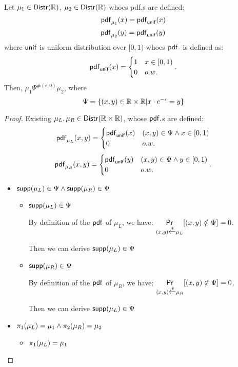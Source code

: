 \documentclass{article}
\begin{document}
\begin{thm}
Let $\mu_1 \in \mathsf{Distr}(\mathbb{R})$, $\mu_2 \in \mathsf{Distr}(\mathbb{R})$ whoes pdf.s are defined:
\[
	\mathsf{pdf}_{\mu_1}(x) = \mathsf{pdf}_{\mathsf{unif}}(x)
\]
\[
	\mathsf{pdf}_{\mu_2}(y) = \mathsf{pdf}_{\mathsf{unif}}(y)
\]
where $\mathsf{unif}$ is uniform distribution over $[0, 1)$ whoes $\mathsf{pdf}.$ is defined as:
\[
	\mathsf{pdf}_{\mathsf{unif}}(x) = 
	\begin{cases}
	1 & x \in [0, 1)\\
	0       & o.w.
	\end{cases}.
\]
Then, $\mu_1 \Psi^{\#(\epsilon, 0)} \mu_2$, where
\[
	\Psi = \{(x,y) \in \mathbb{R} \times \mathbb{R} | x \cdot e^{-\epsilon} = y\}
\]
\end{thm}
\begin{proof}
Existing $\mu_L, \mu_R \in \mathsf{Distr}(\mathbb{R} \times \mathbb{R})$, whose $\mathsf{pdf}.$s are defined:
\[
	\mathsf{pdf}_{\mu_L}(x, y) = 
	\begin{cases}
	\mathsf{pdf}_{\mathsf{unif}}(x) & (x,y) \in \Psi \land x \in [0, 1)\\
	0       & o.w.
	\end{cases}
\]
\[
	\mathsf{pdf}_{\mu_R}(x, y) = 
	\begin{cases}
	\mathsf{pdf}_{\mathsf{unif}}(y) & (x,y) \in \Psi \land y \in [0, 1)\\
	0       & o.w.
	\end{cases}.
\]
\begin{itemize}
	\item $\mathsf{supp}(\mu_L) \in \Psi \land \mathsf{supp}(\mu_R) \in \Psi$

	\begin{itemize}
		\item $\mathsf{supp}(\mu_L) \in \Psi$ 

		By definition of the $\mathsf{pdf}$ of $\mu_L$, we have: $\underset{(x,y) \xleftarrow{\$} \mu_L}{\mathsf{Pr}}[(x,y) \notin \Psi] = 0$.

		Then we can derive $\mathsf{supp}(\mu_L) \in \Psi$

		\item $\mathsf{supp}(\mu_R) \in \Psi$

		By definition of the $\mathsf{pdf}$ of $\mu_R$, we have: $\underset{(x,y) \xleftarrow{\$} \mu_R}{\mathsf{Pr}}[(x,y) \notin \Psi] = 0$.

		Then we can derive $\mathsf{supp}(\mu_L) \in \Psi$

	\end{itemize}		


	\item $\pi_1(\mu_L) = \mu_1 \land \pi_2(\mu_R) = \mu_2$
	
	\begin{itemize}
		\item $\pi_1(\mu_L) = \mu_1$ 


\end{itemize}
\end{itemize}
\end{proof}
\end{document}
